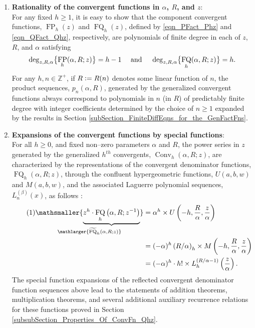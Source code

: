 \documentclass[12pt,reqno]{article}
\numberwithin{sfootnote}{section}
\numberwithin{equation}{section}
\newcommand{\tagonce}[0]{
     \addtocounter{equation}{1}
     \tag{\theequation}
}
\newcommand{\itemlabel}[1]{\textbf{#1}: \\ }
\theoremstyle{DefaultTheoremStyle}
\theoremstyle{definition}
\newcommand{\defequals}{\ensuremath{\vcentcolon=}}
\newcommand{\undersetbrace}[2]{\ensuremath{\underset{\mathlarger{#1}}{\mathsmaller{\underbrace{#2}}}}}
\newcommand{\Pochhammer}[2]{\ensuremath{\left(#1\right)_{#2}}}
\newcommand{\HypU}[3]{\ensuremath{U\left(#1, #2, #3\right)}}
\newcommand{\HypM}[3]{\ensuremath{M\left(#1, #2, #3\right)}}
\newcommand{\ConvGF}[4]{\ensuremath{\Conv_{#1}\left(#2, #3; #4\right)}}
\DeclareMathOperator{\FP}{FP}
\DeclareMathOperator{\FQ}{FQ}
\DeclareMathOperator{\Conv}{Conv}
\begin{document}
\begin{enumerate} 

\item \itemlabel{Rationality of the convergent functions in $\alpha$, $R$, and $z$} 
For any fixed $h \geq 1$, it is easy to show that the 
component convergent functions, $\FP_h(z)$ and $\FQ_h(z)$, 
defined by \eqref{eqn_PFact_Phz} and \eqref{eqn_QFact_Qhz}, respectively, 
are polynomials of finite degree in each of $z$, $R$, and $\alpha$ 
satisfying 
\begin{equation} 
\notag 
\deg_{z,R,\alpha}\bigl\{ \FP_h(\alpha, R; z) \bigr\} = h-1 
     \quad \text{ and } \quad 
\deg_{z,R,\alpha}\bigl\{ \FQ_h(\alpha, R; z) \bigr\} = h. 
\end{equation} 
For any $h, n \in \mathbb{Z}^{+}$, if $R \defequals R(n)$ 
denotes some linear function of $n$, the product sequences, 
$p_n(\alpha, R)$, 
generated by the generalized convergent functions 
always correspond to polynomials in $n$ (in $R$) 
of predictably finite degree with integer coefficients determined by the 
choice of $n \geq 1$ expanded by the results in 
Section \ref{subSection_FiniteDiffEqns_for_the_GenFactFns}. 

\item \itemlabel{Expansions of the convergent functions by 
                 special functions} 
For all $h \geq 0$, and fixed non--zero parameters $\alpha$ and $R$, the 
power series in $z$ generated by the generalized $h^{th}$ 
convergents, $\ConvGF{h}{\alpha}{R}{z}$, are characterized by the 
representations of the convergent denominator functions, 
$\FQ_h(\alpha, R; z)$, through the 
confluent hypergeometric functions, 
$\HypU{a}{b}{w}$ and $\HypM{a}{b}{w}$, and the 
associated Laguerre polynomial sequences, $L_n^{(\beta)}(x)$, 
as follows \citep[\S 13; \S 18]{NISTHB} \citep[\S 4.3.1]{UC}: 
\begin{align*} 
\tagonce\label{eqn_PFact_Qhz_Exp_idents-stmts_v1} 
\undersetbrace{\widetilde{\FQ}_h(\alpha, R; z)}{ 
     z^{h} \cdot \FQ_h\left(\alpha, R; z^{-1}\right) 
} & = 
     \alpha^{h} \times \HypU{-h}{\frac{R}{\alpha}}{\frac{z}{\alpha}} \\ 
     & = 
     (-\alpha)^{h} \Pochhammer{R / \alpha}{h} \times 
     \HypM{-h}{\frac{R}{\alpha}}{\frac{z}{\alpha}} \\ 
     & = 
     (-\alpha)^{h} \cdot h! \times 
     L_h^{(R / \alpha - 1)}\left(\frac{z}{\alpha}\right). 
\end{align*} 
The special function expansions of the reflected convergent denominator 
function sequences above lead to the statements of 
addition theorems, multiplication theorems, and 
several additional auxiliary recurrence relations for these functions 
proved in Section \ref{subsubSection_Properties_Of_ConvFn_Qhz}. 


\end{enumerate}
\end{document}
